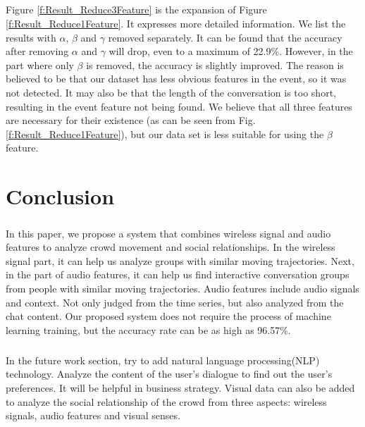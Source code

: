 \documentclass[a4paper,12pt]{report}
\begin{document}
\paragraph{}
Figure \ref{f:Result_Reduce3Feature} is the expansion of Figure \ref{f:Result_Reduce1Feature}. It expresses more detailed information. We list the results with $\alpha$, $\beta$ and $\gamma$ removed separately. It can be found that the accuracy after removing $\alpha$ and $\gamma$ will drop, even to a maximum of 22.9\%. However, in the part where only $\beta$ is removed, the accuracy is slightly improved. The reason is believed to be that our dataset has less obvious features in the event, so it was not detected. It may also be that the length of the conversation is too short, resulting in the event feature not being found. We believe that all three features are necessary for their existence (as can be seen from Fig. \ref{f:Result_Reduce1Feature}), but our data set is less suitable for using the $\beta$ feature.
\clearpage

\chapter{Conclusion}
\paragraph{}
In this paper, we propose a system that combines wireless signal and audio features to analyze crowd movement and social relationships. In the wireless signal part, it can help us analyze groups with similar moving trajectories. Next, in the part of audio features, it can help us find interactive conversation groups from people with similar moving trajectories. Audio features include audio signals and context. Not only judged from the time series, but also analyzed from the chat content. Our proposed system does not require the process of machine learning training, but the accuracy rate can be as high as 96.57\%.
\paragraph{}
In the future work section, try to add natural language processing(NLP) technology. Analyze the content of the user's dialogue to find out the user's preferences. It will be helpful in business strategy. Visual data can also be added to analyze the social relationship of the crowd from three aspects: wireless signals, audio features and visual senses.
\newpage
{}


\end{document}
